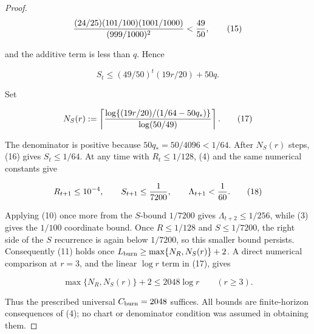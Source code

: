 \begin{proposition}
\begin{proof}
\[
{(24/25)(101/100)(1001/1000)\over(999/1000)^2}
< {49\over50},
\tag{15}
\]

and the additive term is less than \(q\). Hence

\[
S_t\le(49/50)^t(19r/20)+50q.
\tag{16}
\]

Set

\[
N_S(r):=\left\lceil
{\log\{(19r/20)/(1/64-50q_*)\}\over\log(50/49)}
\right\rceil.
\tag{17}
\]

The denominator is positive because \(50q_*=50/4096<1/64\). After
\(N_S(r)\) steps, (16) gives \(S_t\le1/64\). At any time with
\(R_t\le1/128\), (4) and the same numerical constants give

\[
R_{t+1}\le10^{-4},\qquad S_{t+1}\le {1\over7200},\qquad
\Lambda_{t+1}< {1\over60}.
\tag{18}
\]

Applying (10) once more from the \(S\)-bound \(1/7200\) gives
\(\Lambda_{t+2}\le1/256\), while (3) gives the \(1/100\) coordinate bound.
Once \(R\le1/128\) and \(S\le1/7200\), the right side of the \(S\)
recurrence is again below \(1/7200\), so this smaller bound persists.
Consequently (11) holds once
\(L_{\rm burn}\ge\max\{N_R,N_S(r)\}+2\). A direct numerical comparison at
\(r=3\), and the linear \(\log r\) term in (17), gives

\[
\max\{N_R,N_S(r)\}+2\le2048\log r\qquad(r\ge3).
\tag{19}
\]

Thus the prescribed universal \(C_{\rm burn}=2048\) suffices. All bounds are
finite-horizon consequences of (4); no chart or denominator condition was
assumed in obtaining them. 


\end{proof}
\end{proposition}
